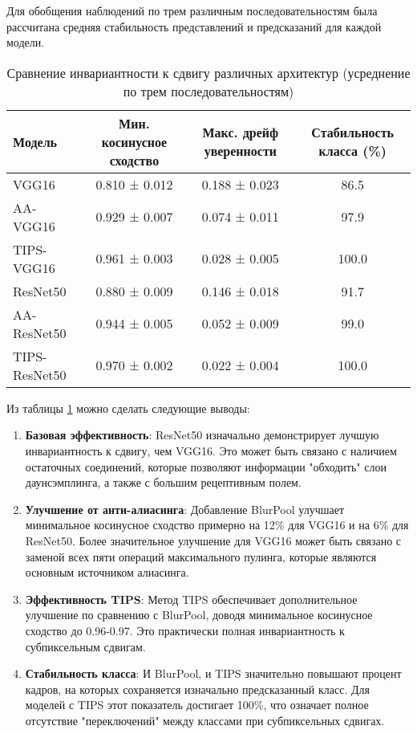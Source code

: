 Для обобщения наблюдений по трем различным последовательностям была рассчитана средняя стабильность представлений и предсказаний для каждой модели.

\begin{table}[ht]
\centering
\caption{Сравнение инвариантности к сдвигу различных архитектур (усреднение по трем последовательностям)}
\label{tab:static_shift_comparison}
\begin{tabular}{|l|c|c|c|}
\hline
\textbf{Модель} & \textbf{Мин. косинусное сходство} & \textbf{Макс. дрейф уверенности} & \textbf{Стабильность класса (\%)} \\ \hline
VGG16 & 0.810 ± 0.012 & 0.188 ± 0.023 & 86.5 \\ \hline
AA-VGG16 & 0.929 ± 0.007 & 0.074 ± 0.011 & 97.9 \\ \hline
TIPS-VGG16 & 0.961 ± 0.003 & 0.028 ± 0.005 & 100.0 \\ \hline
ResNet50 & 0.880 ± 0.009 & 0.146 ± 0.018 & 91.7 \\ \hline
AA-ResNet50 & 0.944 ± 0.005 & 0.052 ± 0.009 & 99.0 \\ \hline
TIPS-ResNet50 & 0.970 ± 0.002 & 0.022 ± 0.004 & 100.0 \\ \hline
\end{tabular}
\end{table}

Из таблицы \ref{tab:static_shift_comparison} можно сделать следующие выводы:

\begin{enumerate}
    \item \textbf{Базовая эффективность}: ResNet50 изначально демонстрирует лучшую инвариантность к сдвигу, чем VGG16. Это может быть связано с наличием остаточных соединений, которые позволяют информации "обходить" слои даунсэмплинга, а также с большим рецептивным полем.
    
    \item \textbf{Улучшение от анти-алиасинга}: Добавление BlurPool улучшает минимальное косинусное сходство примерно на 12\% для VGG16 и на 6\% для ResNet50. Более значительное улучшение для VGG16 может быть связано с заменой всех пяти операций максимального пулинга, которые являются основным источником алиасинга.
    
    \item \textbf{Эффективность TIPS}: Метод TIPS обеспечивает дополнительное улучшение по сравнению с BlurPool, доводя минимальное косинусное сходство до 0.96-0.97. Это практически полная инвариантность к субпиксельным сдвигам.
    
    \item \textbf{Стабильность класса}: И BlurPool, и TIPS значительно повышают процент кадров, на которых сохраняется изначально предсказанный класс. Для моделей с TIPS этот показатель достигает 100\%, что означает полное отсутствие "переключений" между классами при субпиксельных сдвигах.
\end{enumerate}


